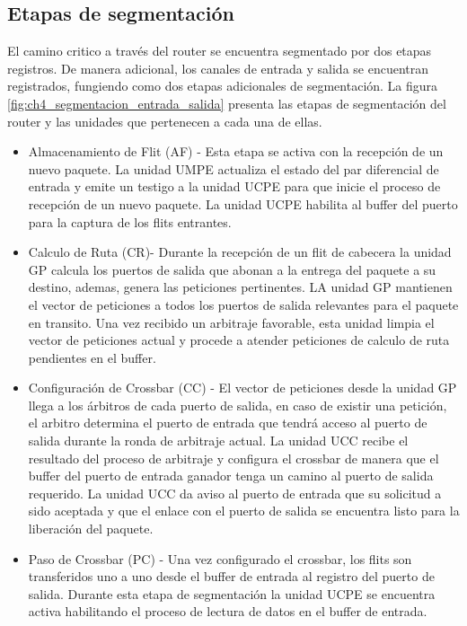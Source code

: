 \subsection{Etapas de segmentación}
	\label{etapas_segmentacion}

El camino critico a través del router se encuentra segmentado por dos etapas registros. De manera adicional, los canales de entrada y salida se encuentran registrados, fungiendo como dos etapas adicionales de segmentación. La figura \ref{fig:ch4_segmentacion_entrada_salida} presenta las etapas de segmentación del router y las unidades que pertenecen a cada una de ellas.


\begin{itemize}[noitemsep]
	\item Almacenamiento de Flit (AF) - Esta etapa se activa con la recepción de un nuevo paquete. La unidad UMPE actualiza el estado del par diferencial de entrada y emite un testigo a la unidad UCPE para que inicie el proceso de recepción de un nuevo paquete. La unidad UCPE habilita al buffer del puerto para la captura de los flits entrantes.
	\item  Calculo de Ruta (CR)- Durante la recepción de un flit de cabecera la unidad GP calcula los puertos de salida que abonan a la entrega del paquete a su destino, ademas, genera las peticiones pertinentes. LA unidad GP mantienen el vector de peticiones a todos los puertos de salida relevantes para el paquete en transito. Una vez recibido un arbitraje favorable, esta unidad limpia el vector de peticiones actual y procede a atender peticiones de calculo de ruta pendientes en el buffer.
	\item Configuración de Crossbar (CC) - El vector de peticiones desde la unidad GP llega a los árbitros de cada puerto de salida, en caso de existir una petición, el arbitro determina el puerto de entrada que tendrá acceso al puerto de salida durante la ronda de arbitraje actual. La unidad UCC recibe el resultado del proceso de arbitraje y configura el crossbar de manera que el buffer del puerto de entrada ganador tenga un camino al puerto de salida requerido. La unidad UCC da aviso al puerto de entrada que su solicitud a sido aceptada y que el enlace con el puerto de salida se encuentra listo para la liberación del paquete.
	\item Paso de Crossbar (PC) - Una vez configurado el crossbar, los flits son transferidos uno a uno desde el buffer de entrada al registro del puerto de salida. Durante esta etapa de segmentación la unidad UCPE se encuentra activa habilitando el proceso de lectura de datos en el buffer de entrada.
\end{itemize}



